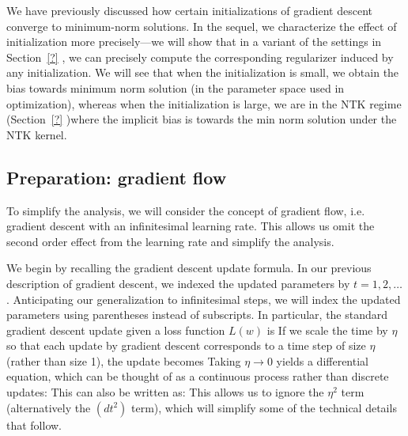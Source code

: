
 

We have previously discussed how certain initializations of gradient descent converge to minimum-norm solutions. In the sequel, we characterize the effect of initialization more precisely---we will show that in a variant of the settings in Section~\ref{?} , we can precisely compute the corresponding regularizer induced by any initialization. We will see that when the initialization is small, we obtain the bias towards minimum norm solution (in the parameter space used in optimization), whereas when the initialization is large, we are in the NTK regime (Section~\ref{?} )where the implicit bias is towards the min norm solution under the NTK kernel.  

\subsection{Preparation: gradient flow}
To simplify the analysis, we will consider the concept of gradient flow, i.e. gradient descent with an infinitesimal learning rate.  This allows us omit the second order effect from the learning rate and simplify the analysis. 

We begin by recalling the gradient descent update formula. In our previous description of gradient descent, we indexed the updated parameters by $t = 1,2,\dots$. Anticipating our generalization to infinitesimal steps, we will index the updated parameters using parentheses instead of subscripts. In particular, the standard gradient descent update given a loss function $L(w)$ is
If we scale the time by $\eta$ so that each update by gradient descent corresponds to a time step of size $\eta$ (rather than size 1), the update becomes
Taking $\eta \to 0$ yields a differential equation, which can be thought of as a continuous process rather than discrete updates:
This can also be written as:
This allows us to ignore the $\eta^2$ term (alternatively the $(dt^2)$ term), which will simplify some of the technical details that follow.

